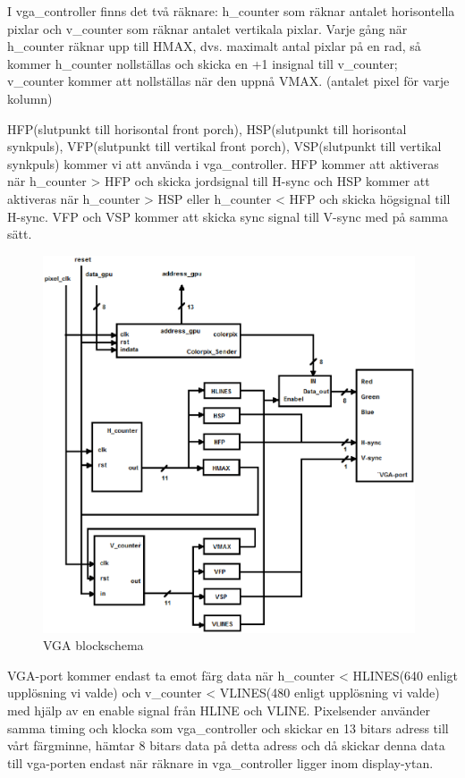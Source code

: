 \documentclass[11pt]{article}
\begin{document}
I vga\_controller finns det två räknare: h\_counter som räknar antalet horisontella pixlar och v\_counter som räknar antalet vertikala pixlar. Varje gång när h\_counter räknar upp till HMAX, dvs. maximalt antal pixlar på en rad, så kommer h\_counter nollställas och skicka en +1 insignal till v\_counter; v\_counter kommer att nollställas när den uppnå VMAX. (antalet pixel för varje kolumn)

HFP(slutpunkt till horisontal front porch), HSP(slutpunkt till horisontal synkpuls), VFP(slutpunkt till vertikal front porch), VSP(slutpunkt till vertikal synkpuls) kommer vi att använda i vga\_controller. HFP kommer att aktiveras när h\_counter > HFP och skicka jordsignal till H-sync och HSP kommer att aktiveras när h\_counter > HSP eller h\_counter < HFP och skicka högsignal till H-sync. VFP och VSP kommer att skicka sync signal till V-sync med på samma sätt.

\begin{figure}[h]
    \begin{center}
        \includegraphics[width=11cm]{vga2.eps}
        \caption{VGA blockschema}
        \label{fig:vga2}
    \end{center}
\end{figure}

\vspace{4cm}

VGA-port kommer endast ta emot färg data när h\_counter < HLINES(640 enligt upplösning vi valde) och v\_counter < VLINES(480 enligt upplösning vi valde) med hjälp av en enable signal från HLINE och VLINE.
Pixelsender använder samma timing och klocka som vga\_controller och skickar en 13 bitars adress till vårt färgminne, hämtar 8 bitars data på detta adress och då skickar denna data till vga-porten endast när räknare in vga\_controller ligger inom display-ytan.
\end{document}
